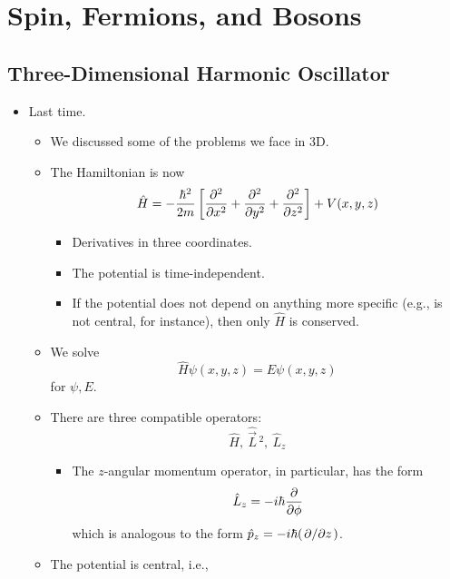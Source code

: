 \documentclass[../notes.tex]{subfiles}
\begin{document}
\chapter{Spin, Fermions, and Bosons}
\section{Three-Dimensional Harmonic Oscillator}
\begin{itemize}
    \item {}Last time.
    \begin{itemize}
        \item We discussed some of the problems we face in 3D.
        \item The Hamiltonian is now
        \begin{equation*}
            \hat{H} = -\frac{\hbar^2}{2m}\left[ \pdv[2]{x}+\pdv[2]{y}+\pdv[2]{z} \right]+V(x,y,z)
        \end{equation*}
        \begin{itemize}
            \item Derivatives in three coordinates.
            \item The potential is time-independent.
            \item If the potential does not depend on anything more specific (e.g., is not central, for instance), then only $\hat{H}$ is conserved.
        \end{itemize}
        \item We solve
        \begin{equation*}
            \hat{H}\psi(x,y,z) = E\psi(x,y,z)
        \end{equation*}
        for $\psi,E$.
        \item There are three compatible operators:
        \begin{equation*}
            \hat{H},\ \hat{\vec{L}}{\,}^2,\ \hat{L}_z
        \end{equation*}
        \begin{itemize}
            \item The $z$-angular momentum operator, in particular, has the form
            \begin{equation*}
                \hat{L}_z = -i\hbar\pdv{\phi}
            \end{equation*}
            which is analogous to the form $\hat{p}_z=-i\hbar(\pdv*{z})$.
        \end{itemize}
        \item The potential is central, i.e.,

\end{itemize}
\end{itemize}
\end{document}
